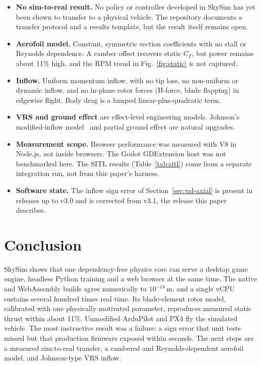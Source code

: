 \documentclass{ieeeaccess}
\newcommand{\skysim}{SkySim\xspace}
\begin{document}
\begin{itemize}
\item \textbf{No sim-to-real result.} No policy or controller developed in
\skysim has yet been shown to transfer to a physical vehicle. The repository
documents a transfer protocol and a results template, but the result itself
remains open.
\item \textbf{Aerofoil model.} Constant, symmetric section coefficients with no
stall or Reynolds dependence. A camber offset recovers static $C_T$, but power
remains about 11\% high, and the RPM trend in Fig.~\ref{fig:static} is not
captured.
\item \textbf{Inflow.} Uniform momentum inflow, with no tip loss, no
non-uniform or dynamic inflow, and no in-plane rotor forces (H-force, blade
flapping) in edgewise flight. Body drag is a lumped linear-plus-quadratic term.
\item \textbf{VRS and ground effect} are effect-level engineering models.
Johnson's modified-inflow model~\cite{johnson2005vrs} and partial ground effect
are natural upgrades.
\item \textbf{Measurement scope.} Browser performance was measured with V8 in
Node.js, not inside browsers. The Godot GDExtension host was not benchmarked
here. The SITL results (Table~\ref{tab:sitl}) come from a separate integration
run, not from this paper's harness.
\item \textbf{Software state.} The inflow sign error of
Section~\ref{sec:val-axial} is present in releases up to v3.0 and is
corrected from v3.1, the release this paper describes.
\end{itemize}

\section{Conclusion}
\skysim shows that one dependency-free physics core can serve a desktop game
engine, headless Python training and a web browser at the same time. The
native and WebAssembly builds agree numerically to $10^{-14}$\,m, and a single
vCPU sustains several hundred times real time. Its blade-element rotor model, calibrated with one
physically motivated parameter, reproduces measured static thrust within about
11\%. Unmodified ArduPilot and PX4 fly the simulated vehicle. The most
instructive result was a failure: a sign error that unit tests missed but that
production firmware exposed within seconds. The next steps are a measured
sim-to-real transfer, a cambered and Reynolds-dependent aerofoil model, and
Johnson-type VRS inflow.
\end{document}
